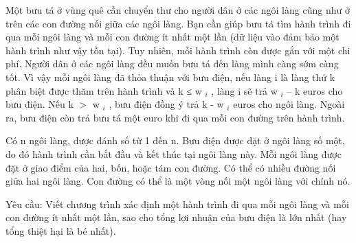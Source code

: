 Một bưu tá ở vùng quê cần chuyển thư cho người dân ở các ngôi làng cũng như ở trên các con đường nối giữa các ngôi làng. Bạn cần giúp bưu tá tìm hành trình đi qua mỗi ngôi làng và mỗi con đường ít   nhất một lần (dữ liệu vào đảm bảo một hành trình như vậy tồn tại). Tuy nhiên, mỗi hành trình còn được gắn với một chi phí. Người dân ở các ngôi làng đều muốn bưu tá đến làng mình càng sớm càng tốt. Vì vậy   mỗi ngôi làng đã thỏa thuận với bưu điện, nếu làng i là làng thứ k phân biệt được thăm trên hành trình và k ≤ w   $_    i   $   , làng i sẽ trả w   $_    i   $   – k euros cho bưu điện. Nếu k $>$ w   $_    i   $   ,   bưu điện đồng ý trả k - w   $_    i   $   euros cho ngôi làng. Ngoài ra, bưu điện còn trả bưu tá một euro khi đi qua mỗi con đường trên hành trình.  

   Có n ngôi làng, được đánh số từ 1 đến n. Bưu điện được đặt ở ngôi làng số một, do đó hành trình cần bắt đầu và kết thúc tại ngôi làng này. Mỗi ngôi làng được đặt ở giao điểm của hai, bốn, hoặc tám con   đường. Có thể có nhiều đường nối giữa hai ngôi làng. Con đường có thể là một vòng nối một ngôi làng với chính nó.  

   Yêu cầu: Viết chương trình xác định một hành trình đi qua mỗi ngôi làng và mỗi con đường ít nhất một lần, sao cho tổng lợi nhuận của bưu điện là lớn nhất (hay tổng thiệt hại là bé nhất).